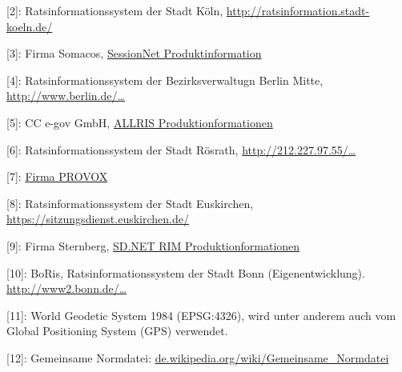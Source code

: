 \documentclass[,a4paper]{article}
\begin{document}
{[}2{]}: Ratsinformationssystem der Stadt Köln,
\href{http://ratsinformation.stadt-koeln.de/}{http://ratsinformation.stadt-koeln.de/}

{[}3{]}: Firma Somacos,
\href{http://www.somacos.de/de/sitzungsdienst/ratsinfo.html}{SessionNet
Produktinformation}

{[}4{]}: Ratsinformationssystem der Bezirksverwaltugn Berlin Mitte,
\href{http://www.berlin.de/ba-mitte/bvv-online/allris.net.asp}{http://www.berlin.de/\ldots{}}

{[}5{]}: CC e-gov GmbH, \href{http://www.cc-egov.de/allris.htm}{ALLRIS
Produktionformationen}

{[}6{]}: Ratsinformationssystem der Stadt Rösrath,
\href{http://212.227.97.55/ratsinfo/roesrath}{http://212.227.97.55/\ldots{}}

{[}7{]}: \href{http://www.provox.de/}{Firma PROVOX}

{[}8{]}: Ratsinformationssystem der Stadt Euskirchen,
\href{https://sitzungsdienst.euskirchen.de/}{https://sitzungsdienst.euskirchen.de/}

{[}9{]}: Firma Sternberg,
\href{http://www.sitzungsdienst.net/produkte/ratsinformationsmanagement}{SD.NET
RIM Produktionformationen}

{[}10{]}: BoRis, Ratsinformationssystem der Stadt Bonn
(Eigenentwicklung).
\href{http://www2.bonn.de/bo\_ris/ris\_sql/agm\_index.asp}{http://www2.bonn.de/\ldots{}}

{[}11{]}: World Geodetic System 1984 (EPSG:4326), wird unter anderem
auch vom Global Positioning System (GPS) verwendet.

{[}12{]}: Gemeinsame Normdatei:
\href{http://de.wikipedia.org/wiki/Gemeinsame\_Normdatei}{de.wikipedia.org/wiki/Gemeinsame\_Normdatei}
\end{document}
